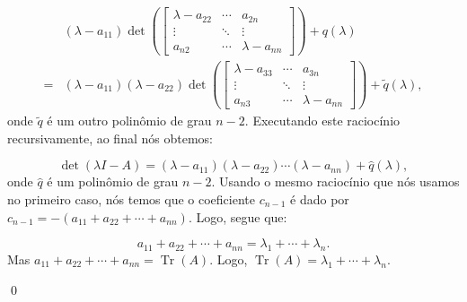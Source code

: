 \begin{Proof}
	\begin{align*}
		& (\lambda - a_{11})\det\left(\begin{bmatrix}
			\lambda - a_{22} & \cdots & a_{2n} \\
			\vdots & \ddots & \vdots \\
			a_{n2} & \cdots & \lambda - a_{nn}
		\end{bmatrix}\right) + q(\lambda)\\ = & (\lambda - a_{11})(\lambda - a_{22})\det\left(\begin{bmatrix}
			\lambda - a_{33} & \cdots & a_{3n} \\
			\vdots & \ddots & \vdots \\
			a_{n3} & \cdots & \lambda - a_{nn}
		\end{bmatrix}\right) + \tilde{q}(\lambda),
	\end{align*}
	onde $\tilde{q}$ é um outro polinômio de grau $n - 2$. Executando este raciocínio recursivamente, ao final nós obtemos:
	
	$$
	\det(\lambda I - A) = (\lambda - a_{11})(\lambda - a_{22})\cdots(\lambda - a_{nn}) + \hat{q}(\lambda),
	$$
	onde $\hat{q}$ é um polinômio de grau $n - 2$. Usando o mesmo raciocínio que nós usamos no primeiro caso, nós temos que o coeficiente $c_{n - 1}$ é dado por $c_{n - 1} = - (a_{11} + a_{22} + \cdots + a_{nn})$. Logo, segue que:
	
	$$
	a_{11} + a_{22} + \cdots + a_{nn} = \lambda_1 + \cdots + \lambda_n.
	$$
	Mas $a_{11} + a_{22} + \cdots + a_{nn} = \operatorname{Tr}(A)$. Logo, $\operatorname{Tr}(A) = \lambda_1 + \cdots + \lambda_n$.
	
	\qed
\end{Proof}